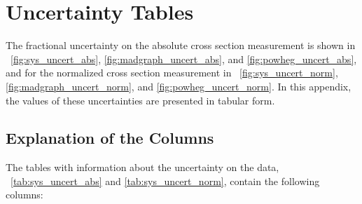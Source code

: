 \chapter{Uncertainty Tables}
\label{app:uncertainty_tables}

The fractional uncertainty on the absolute cross section measurement is shown
in \FIGS~\ref{fig:sys_uncert_abs}, \ref{fig:madgraph_uncert_abs}, and
\ref{fig:powheg_uncert_abs}, and for the normalized cross section measurement
in \FIGS~\ref{fig:sys_uncert_norm}, \ref{fig:madgraph_uncert_norm}, and
\ref{fig:powheg_uncert_norm}. In this appendix, the values of these
uncertainties are presented in tabular form.

\section{Explanation of the Columns}

The tables with information about the uncertainty on the data,
\TABS~\ref{tab:sys_uncert_abs} and \ref{tab:sys_uncert_norm}, contain the
following columns:

